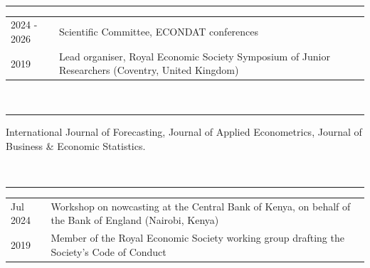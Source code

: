 \documentclass[11pt,a4paper]{article}
\makeatletter
\newcommand{\cvsection}[1]{\vspace{10pt}{\small\bfseries #1}\\[-7pt]\rule{\linewidth}{0.6pt}\vspace{2pt}}
\newenvironment{cvtable}{\small\begin{longtable}{@{}p{3.3cm}p{\dimexpr\linewidth-3.3cm-2\tabcolsep\relax}@{}}}{\end{longtable}\vspace{-14pt}}
\makeatother
\begin{document}
\cvsection{Conference Organiser and Program Committee}
\begin{cvtable}
2024 - 2026 & Scientific Committee, ECONDAT conferences \\
2019 & Lead organiser, Royal Economic Society Symposium of Junior Researchers (Coventry, United Kingdom) \\
\end{cvtable}

\cvsection{Refereeing}
{\small International Journal of Forecasting, Journal of Applied Econometrics, Journal of Business \& Economic Statistics.}

\cvsection{Professional Service}
\begin{cvtable}
Jul 2024 & Workshop on nowcasting at the Central Bank of Kenya, on behalf of the Bank of England (Nairobi, Kenya) \\
2019 & Member of the Royal Economic Society working group drafting the Society's Code of Conduct \\
\end{cvtable}
\end{document}
